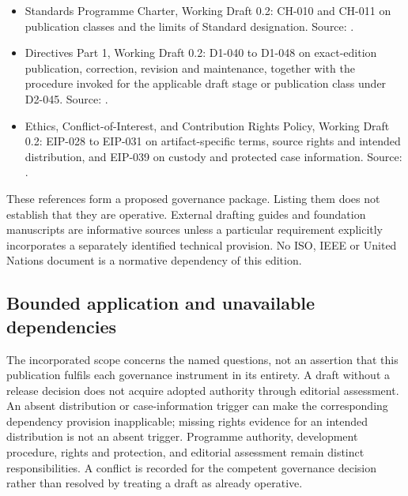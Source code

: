 \documentclass[11pt,a4paper]{article}
\begin{document}
\begin{itemize}
\item Standards Programme Charter, Working Draft 0.2: CH-010 and CH-011 on publication classes and the limits of Standard designation. Source: .
\item Directives Part 1, Working Draft 0.2: D1-040 to D1-048 on exact-edition publication, correction, revision and maintenance, together with the procedure invoked for the applicable draft stage or publication class under D2-045. Source: .
\item Ethics, Conflict-of-Interest, and Contribution Rights Policy, Working Draft 0.2: EIP-028 to EIP-031 on artifact-specific terms, source rights and intended distribution, and EIP-039 on custody and protected case information. Source: .
\end{itemize}
These references form a proposed governance package. Listing them does not establish that they are operative. External drafting guides and foundation manuscripts are informative sources unless a particular requirement explicitly incorporates a separately identified technical provision. No ISO, IEEE or United Nations document is a normative dependency of this edition.

\subsection{Bounded application and unavailable dependencies}

The incorporated scope concerns the named questions, not an assertion that this publication fulfils each governance instrument in its entirety. A draft without a release decision does not acquire adopted authority through editorial assessment. An absent distribution or case-information trigger can make the corresponding dependency provision inapplicable; missing rights evidence for an intended distribution is not an absent trigger. Programme authority, development procedure, rights and protection, and editorial assessment remain distinct responsibilities. A conflict is recorded for the competent governance decision rather than resolved by treating a draft as already operative.
\end{document}
